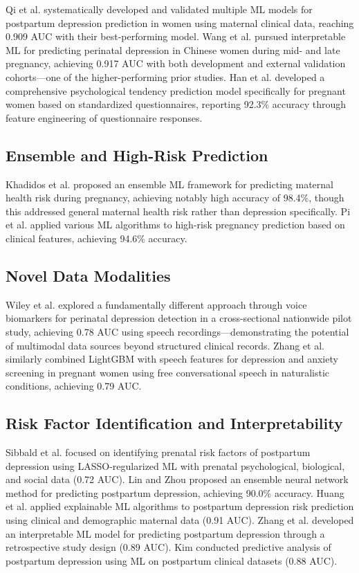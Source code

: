 \documentclass[12pt,a4paper]{article}
\begin{document}
Qi et al.\cite{qi2025} systematically developed and validated multiple ML models for postpartum depression prediction in women using maternal clinical data, reaching 0.909 AUC with their best-performing model. Wang et al.\cite{wang2025} pursued interpretable ML for predicting perinatal depression in Chinese women during mid- and late pregnancy, achieving 0.917 AUC with both development and external validation cohorts---one of the higher-performing prior studies. Han et al.\cite{han2023} developed a comprehensive psychological tendency prediction model specifically for pregnant women based on standardized questionnaires, reporting 92.3\% accuracy through feature engineering of questionnaire responses.

\subsection{Ensemble and High-Risk Prediction}

Khadidos et al.\cite{khadidos2024} proposed an ensemble ML framework for predicting maternal health risk during pregnancy, achieving notably high accuracy of 98.4\%, though this addressed general maternal health risk rather than depression specifically. Pi et al.\cite{pi2025} applied various ML algorithms to high-risk pregnancy prediction based on clinical features, achieving 94.6\% accuracy.

\subsection{Novel Data Modalities}

Wiley et al.\cite{wiley2025} explored a fundamentally different approach through voice biomarkers for perinatal depression detection in a cross-sectional nationwide pilot study, achieving 0.78 AUC using speech recordings---demonstrating the potential of multimodal data sources beyond structured clinical records. Zhang et al.\cite{zhang2024speech} similarly combined LightGBM with speech features for depression and anxiety screening in pregnant women using free conversational speech in naturalistic conditions, achieving 0.79 AUC.

\subsection{Risk Factor Identification and Interpretability}

Sibbald et al.\cite{sibbald2025} focused on identifying prenatal risk factors of postpartum depression using LASSO-regularized ML with prenatal psychological, biological, and social data (0.72 AUC). Lin and Zhou\cite{lin2025} proposed an ensemble neural network method for predicting postpartum depression, achieving 90.0\% accuracy. Huang et al.\cite{huang2025explain} applied explainable ML algorithms to postpartum depression risk prediction using clinical and demographic maternal data (0.91 AUC). Zhang et al.\cite{zhang2025interp} developed an interpretable ML model for predicting postpartum depression through a retrospective study design (0.89 AUC). Kim\cite{kim2025} conducted predictive analysis of postpartum depression using ML on postpartum clinical datasets (0.88 AUC).
\end{document}
